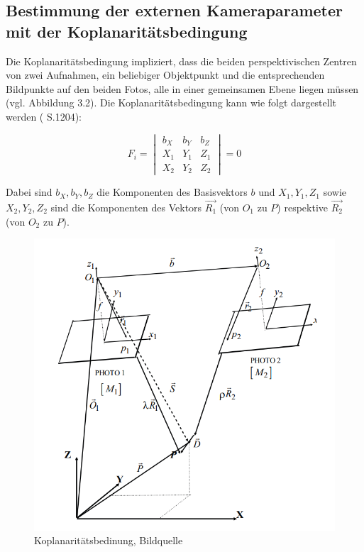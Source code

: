 \subsection{Bestimmung der externen Kameraparameter mit der Koplanaritätsbedingung}

Die Koplanaritätsbedingung impliziert, dass die beiden perspektivischen Zentren von zwei Aufnahmen, ein beliebiger Objektpunkt und die entsprechenden Bildpunkte auf den beiden Fotos, alle in einer gemeinsamen Ebene liegen müssen (vgl. Abbildung 3.2). Die Koplanaritätsbedingung kann wie folgt dargestellt werden (\cite{pose_est_epi} S.1204):

\begin{equation}
F_i = \begin{vmatrix}
b_X & b_Y & b_Z \\
X_1 & Y_1 & Z_1 \\
X_2 & Y_2 & Z_2
\end{vmatrix}
=0
\end{equation}

Dabei sind $b_X,b_Y,b_Z$ die Komponenten des Basisvektors $b$ und $X_1,Y_1,Z_1$ sowie $X_2,Y_2,Z_2$ sind die Komponenten des Vektors $\vec{R_1}$ (von $O_1$ zu $P$) respektive  $\vec{R_2}$ (von $O_2$ zu $P$).


\begin{figure}[H]
	\centering
	\includegraphics[scale=0.6]{coplanarity.png}
	\caption{Koplanaritätsbedinung, Bildquelle \cite{comparative_conditions_study}}
\end{figure} 

